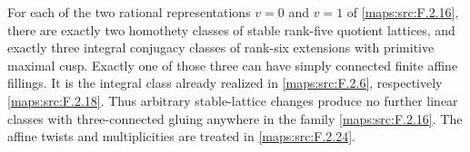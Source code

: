 \begin{theorem}\hypertarget{tag-02ND}{}\label{maps:src:F.2.23}


For each of the two rational representations $v=0$ and $v=1$
of \ref{maps:src:F.2.16}, there are exactly two homothety classes of stable
rank-five quotient lattices, and exactly three integral
conjugacy classes of rank-six extensions with primitive
maximal cusp.  Exactly one of those three can have simply
connected finite affine fillings.  It is the integral class
already realized in \ref{maps:src:F.2.6}, respectively \ref{maps:src:F.2.18}.
Thus arbitrary stable-lattice changes produce no further
linear classes with three-connected gluing anywhere in the family \ref{maps:src:F.2.16}.
The affine twists and multiplicities are treated in \cref{maps:src:F.2.24}.

\end{theorem}


